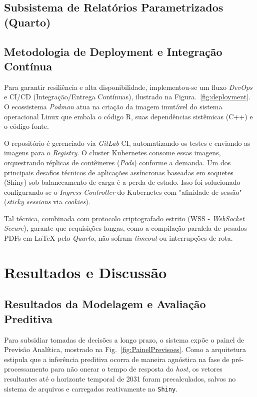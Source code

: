 \documentclass[12pt,a4paper]{article}
\begin{document}
\subsection{Subsistema de Relatórios Parametrizados (Quarto)}


\subsection{Metodologia de Deployment e Integração Contínua}

Para garantir resiliência e alta disponibilidade, implementou-se um fluxo \textit{DevOps} e CI/CD (Integração/Entrega Contínuas), ilustrado na Figura.~\ref{fig:deployment}. O ecossistema \textit{Podman} \cite{podman2026} atua na criação da imagem imutável do sistema operacional Linux que embala o código R, suas dependências sistêmicas (C++) e o código fonte. 

O repositório é gerenciado via \textit{GitLab} CI, automatizando os testes e enviando as imagens para o \textit{Registry}. O cluster Kubernetes \cite{burns2016borgomega} consome essas imagens, orquestrando réplicas de contêineres (\textit{Pods}) conforme a demanda. Um dos principais desafios técnicos de aplicações assíncronas baseadas em soquetes (Shiny) sob balanceamento de carga é a perda de estado. Isso foi solucionado configurando-se o \textit{Ingress Controller} do Kubernetes com "afinidade de sessão" (\textit{sticky sessions} via \textit{cookies}). 

Tal técnica, combinada com protocolo criptografado estrito (WSS - \textit{WebSocket Secure}), garante que requisições longas, como a compilação paralela de pesados PDFs em LaTeX pelo \textit{Quarto}, não sofram \textit{timeout} ou interrupções de rota.


\section{Resultados e Discussão}

\subsection{Resultados da Modelagem e Avaliação Preditiva}

Para subsidiar tomadas de decisões a longo prazo, o sistema expõe o painel de Previsão Analítica, mostrado na Fig.~\ref{fig:PainelPrevisoes}. Como a arquitetura estipula que a inferência preditiva ocorra de maneira agnóstica na fase de pré-processamento para não onerar o tempo de resposta do \textit{host}, os vetores resultantes até o horizonte temporal de 2031 foram precalculados, salvos no sistema de arquivos e carregados reativamente no \texttt{Shiny}.
\end{document}
